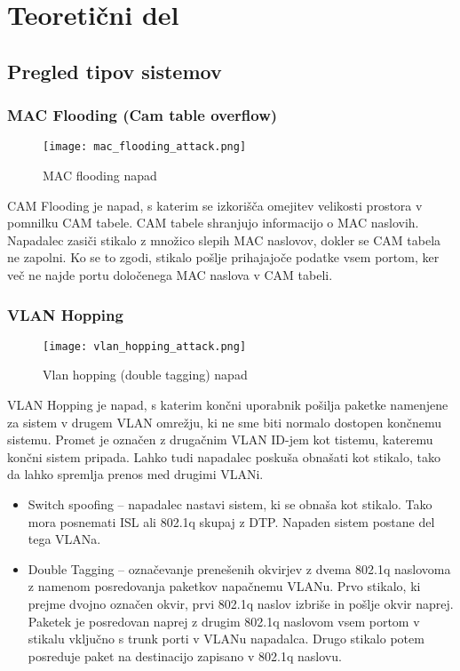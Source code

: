 \documentclass[12pt]{article}
\let\stdsection\section
\renewcommand\section{\newpage\stdsection}
\begin{document}
\section{Teoretični del}

\subsection{Pregled tipov sistemov}
 
\subsubsection{MAC Flooding (Cam table overflow)}

\begin{figure}[htb]
\begin{center}
\texttt{[image: mac\_flooding\_attack.png]}
\end{center}
\caption{MAC flooding napad}
\label{mac_flooding}
\end{figure}

CAM Flooding je napad, s katerim se izkorišča omejitev velikosti prostora v pomnilku CAM tabele. CAM tabele shranjujo informacijo o MAC naslovih. Napadalec zasiči stikalo z množico slepih MAC naslovov, dokler se CAM tabela ne zapolni. Ko se to zgodi, stikalo pošlje prihajajoče podatke vsem portom, ker več ne najde portu določenega MAC naslova v CAM tabeli.  


\subsubsection{VLAN Hopping}

\begin{figure}[htb]
\begin{center}
\texttt{[image: vlan\_hopping\_attack.png]}
\end{center}
\caption{Vlan hopping (double tagging) napad}
\label{vlan_hopping}
\end{figure}

VLAN Hopping je napad, s katerim končni uporabnik pošilja paketke namenjene za sistem v drugem VLAN omrežju, ki ne sme biti normalo dostopen končnemu sistemu. Promet je označen z drugačnim VLAN ID-jem kot tistemu, kateremu končni sistem pripada. Lahko tudi napadalec poskuša obnašati kot stikalo, tako da lahko spremlja prenos med drugimi VLANi.
\begin{itemize}
    \item Switch spoofing – napadalec nastavi sistem, ki se obnaša kot stikalo. Tako mora posnemati ISL ali 802.1q skupaj z DTP. Napaden sistem postane del tega VLANa.
    \item Double Tagging – označevanje prenešenih okvirjev z dvema 802.1q naslovoma z namenom posredovanja paketkov napačnemu VLANu. Prvo stikalo, ki prejme dvojno označen okvir, prvi 802.1q naslov izbriše in pošlje okvir naprej. Paketek je posredovan naprej z drugim 802.1q naslovom vsem portom v stikalu vključno s trunk porti v VLANu napadalca. Drugo stikalo potem posreduje paket na destinacijo zapisano v 802.1q naslovu.
\end{itemize}
\end{document}
